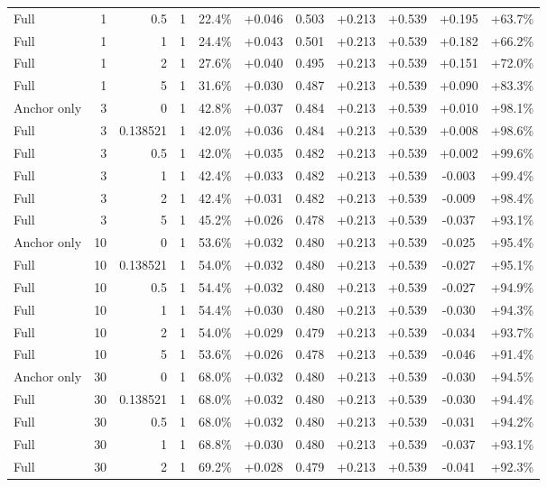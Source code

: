 \begin{table}[htbp]
\begin{tabular}{lrrrccccccc}
Full & 1 & 0.5 & 1 & 22.4\% & +0.046 & 0.503 & +0.213 & +0.539 & +0.195 & +63.7\% \\
Full & 1 & 1 & 1 & 24.4\% & +0.043 & 0.501 & +0.213 & +0.539 & +0.182 & +66.2\% \\
Full & 1 & 2 & 1 & 27.6\% & +0.040 & 0.495 & +0.213 & +0.539 & +0.151 & +72.0\% \\
Full & 1 & 5 & 1 & 31.6\% & +0.030 & 0.487 & +0.213 & +0.539 & +0.090 & +83.3\% \\
Anchor only & 3 & 0 & 1 & 42.8\% & +0.037 & 0.484 & +0.213 & +0.539 & +0.010 & +98.1\% \\
Full & 3 & 0.138521 & 1 & 42.0\% & +0.036 & 0.484 & +0.213 & +0.539 & +0.008 & +98.6\% \\
Full & 3 & 0.5 & 1 & 42.0\% & +0.035 & 0.482 & +0.213 & +0.539 & +0.002 & +99.6\% \\
Full & 3 & 1 & 1 & 42.4\% & +0.033 & 0.482 & +0.213 & +0.539 & -0.003 & +99.4\% \\
Full & 3 & 2 & 1 & 42.4\% & +0.031 & 0.482 & +0.213 & +0.539 & -0.009 & +98.4\% \\
Full & 3 & 5 & 1 & 45.2\% & +0.026 & 0.478 & +0.213 & +0.539 & -0.037 & +93.1\% \\
Anchor only & 10 & 0 & 1 & 53.6\% & +0.032 & 0.480 & +0.213 & +0.539 & -0.025 & +95.4\% \\
Full & 10 & 0.138521 & 1 & 54.0\% & +0.032 & 0.480 & +0.213 & +0.539 & -0.027 & +95.1\% \\
Full & 10 & 0.5 & 1 & 54.4\% & +0.032 & 0.480 & +0.213 & +0.539 & -0.027 & +94.9\% \\
Full & 10 & 1 & 1 & 54.4\% & +0.030 & 0.480 & +0.213 & +0.539 & -0.030 & +94.3\% \\
Full & 10 & 2 & 1 & 54.0\% & +0.029 & 0.479 & +0.213 & +0.539 & -0.034 & +93.7\% \\
Full & 10 & 5 & 1 & 53.6\% & +0.026 & 0.478 & +0.213 & +0.539 & -0.046 & +91.4\% \\
Anchor only & 30 & 0 & 1 & 68.0\% & +0.032 & 0.480 & +0.213 & +0.539 & -0.030 & +94.5\% \\
Full & 30 & 0.138521 & 1 & 68.0\% & +0.032 & 0.480 & +0.213 & +0.539 & -0.030 & +94.4\% \\
Full & 30 & 0.5 & 1 & 68.0\% & +0.032 & 0.480 & +0.213 & +0.539 & -0.031 & +94.2\% \\
Full & 30 & 1 & 1 & 68.8\% & +0.030 & 0.480 & +0.213 & +0.539 & -0.037 & +93.1\% \\
Full & 30 & 2 & 1 & 69.2\% & +0.028 & 0.479 & +0.213 & +0.539 & -0.041 & +92.3\% \\

\end{tabular}
\end{table}
